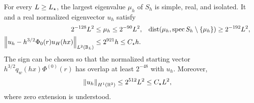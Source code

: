 \begin{lemma}
\label{c:lem:effectivemass}
For every $L\ge L_\star$, the largest eigenvalue $\mu_h$ of $S_h$ is simple,
real, and isolated. It and a real normalized eigenvector $u_h$ satisfy
\begin{align}
 2^{-128}L^2&\le\mu_h\le2^{-90}L^2,
 &\operatorname{dist}(\mu_h,\operatorname{spec} S_h\setminus\{\mu_h\})&\ge2^{-192}L^2,
                                                               \label{c:eq:mugap}\\
 \left\lVert u_h-h^{3/2}\Phi_0(r)u_H(hx)\right\rVert_{L^2(\mathbb B_L)}&\le2^{921} h\le C_\star h.
                                                               \label{c:eq:modeapprox}
\end{align}
The sign can be chosen so that the normalized starting vector
$h^{3/2}q_w(hx)\Phi^{(0)}(r)$ has overlap at least $2^{-48}$ with $u_h$.
Moreover,
\begin{equation}
 \left\lVert u_h\right\rVert_{H^1(\mathbb R^3)}\le2^{512}L^2\le C_\star L^2,                   \label{c:eq:modeH1}
\end{equation}
where zero extension is understood.
\end{lemma}
